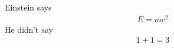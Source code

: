 Einstein says
\begin{align}
E = mc^2 \label{clever}
\end{align}
He didn’t say
\begin{align}
1 + 1 = 3 \tag{dumb}
\end{align}